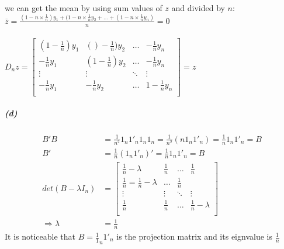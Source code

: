 \documentclass[UTF8]{article}
\begin{document}
    we can get the mean by using sum values of $z$ and divided by $n$:
    \\
    $\overline{z} = \frac{(1-n \times \frac{1}{n}) y_1 + (1-n \times \frac{1}{n} y_2 + \dots + (1-n \times \frac{1}{n} y_n )}{n} = 0$
    \\
    \\
    $D_nz =
    \begin{bmatrix}
      (1-\frac{1}{n})y_1 & ()-\frac{1}{n})y_2 & \dots & -\frac{1}{n}y_n \\
      -\frac{1}{n}y_1 & (1-\frac{1}{n})y_2 & \dots & -\frac{1}{n}y_n  \\
      \vdots & \vdots & \ddots & \vdots \\
      -\frac{1}{n}y_1 & -\frac{1}{n}y_2 &\dots & 1-\frac{1}{n}y_n  \\
    \end{bmatrix}
    = z $
  \subparagraph{(d)}
    \begin{align*}
        B'B &= \frac{1}{n^2} 1_n 1'_n1_n1_n = \frac{1}{n^2}(n1_n1'_n) = \frac{1}{n}1_n1'_n = B \\
        B' &= \frac{1}{n} (1_n1'_n)' = \frac{1}{n} 1_n1'_n = B \\
        det(B - \lambda I_n) &=
        \begin{bmatrix}
          \frac{1}{n} - \lambda & \frac{1}{n} & \dots & \frac{1}{n} \\
          \frac{1}{n} = \frac{1}{n} - \lambda & \dots & \frac{1}{n} \\
          \vdots & \vdots & \ddots & \vdots \\
          \frac{1}{n} & \frac{1}{n} & \dots & \frac{1}{n} - \lambda \\
        \end{bmatrix} \\
        \Rightarrow \lambda &= \frac{1}{n}
    \end{align*}
    It is noticeable that $B = \frac{1}1_n1'_n$ is the projection matrix and
    its eignvalue is $\frac{1}{n}$
\end{document}
